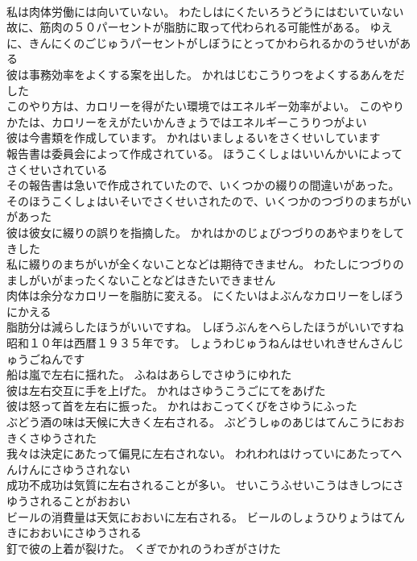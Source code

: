\documentclass[8pt]{extreport}
\begin{document}
\begin{CJK}{UTF8}{min}
\\	私は肉体労働には向いていない。	わたしはにくたいろうどうにはむいていない 
\\	故に、筋肉の５０パーセントが脂肪に取って代わられる可能性がある。	ゆえに、きんにくのごじゅうパーセントがしぼうにとってかわられるかのうせいがある 
\\	彼は事務効率をよくする案を出した。	かれはじむこうりつをよくするあんをだした 
\\	このやり方は、カロリーを得がたい環境ではエネルギー効率がよい。	このやりかたは、カロリーをえがたいかんきょうではエネルギーこうりつがよい 
\\	彼は今書類を作成しています。	かれはいましょるいをさくせいしています 
\\	報告書は委員会によって作成されている。	ほうこくしょはいいんかいによってさくせいされている 
\\	その報告書は急いで作成されていたので、いくつかの綴りの間違いがあった。	そのほうこくしょはいそいでさくせいされたので、いくつかのつづりのまちがいがあった 
\\	彼は彼女に綴りの誤りを指摘した。	かれはかのじょびつづりのあやまりをしてきした 
\\	私に綴りのまちがいが全くないことなどは期待できません。	わたしにつづりのましがいがまったくないことなどはきたいできません 
\\	肉体は余分なカロリーを脂肪に変える。	にくたいはよぶんなカロリーをしぼうにかえる 
\\	脂肪分は減らしたほうがいいですね。	しぼうぶんをへらしたほうがいいですね 
\\	昭和１０年は西暦１９３５年です。	しょうわじゅうねんはせいれきせんさんじゅうごねんです 
\\	船は嵐で左右に揺れた。	ふねはあらしでさゆうにゆれた 
\\	彼は左右交互に手を上げた。	かれはさゆうこうごにてをあげた 
\\	彼は怒って首を左右に振った。	かれはおこってくびをさゆうにふった 
\\	ぶどう酒の味は天候に大きく左右される。	ぶどうしゅのあじはてんこうにおおきくさゆうされた 
\\	我々は決定にあたって偏見に左右されない。	われわれはけっていにあたってへんけんにさゆうされない 
\\	成功不成功は気質に左右されることが多い。	せいこうふせいこうはきしつにさゆうされることがおおい 
\\	ビールの消費量は天気におおいに左右される。	ビールのしょうひりょうはてんきにおおいにさゆうされる 
\\	釘で彼の上着が裂けた。	くぎでかれのうわぎがさけた 

\end{CJK}
\end{document}
